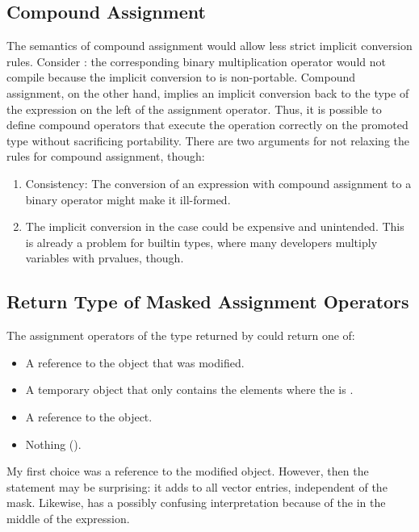 \subsection{Compound Assignment}
The semantics of compound assignment would allow less strict implicit conversion rules.
Consider : the corresponding binary multiplication operator would not compile because the implicit conversion to \simd[<double>] is non-portable.
Compound assignment, on the other hand, implies an implicit conversion back to the type of the expression on the left of the assignment operator.
Thus, it is possible to define compound operators that execute the operation correctly on the promoted type without sacrificing portability.
There are two arguments for not relaxing the rules for compound assignment, though:
\begin{enumerate}
  \item Consistency: The conversion of an expression with compound assignment to a binary operator might make it ill-formed.
  \item The implicit conversion in the  case could be expensive and unintended.
    This is already a problem for builtin types, where many developers multiply \float variables with \double prvalues, though.
\end{enumerate}

\subsection{Return Type of Masked Assignment Operators}
The assignment operators of the type returned by  could return one of:
\begin{itemize}
  \item A reference to the \simd object that was modified.
  \item A temporary \simd object that only contains the elements where the \mask is \true.
  \item A reference to the  object.
  \item Nothing (\ie \void).
\end{itemize}
My first choice was a reference to the modified \simd object.
However, then the statement  may be surprising: it adds  to all vector entries, independent of the mask.
Likewise,  has a possibly confusing interpretation because of the \mask in the middle of the expression.

